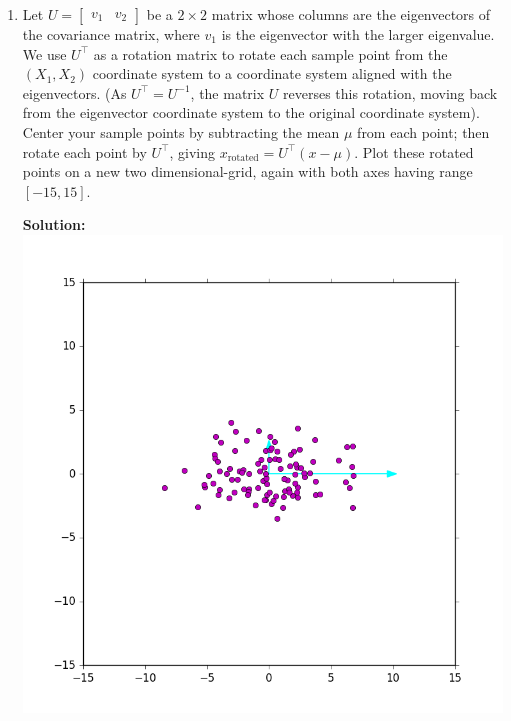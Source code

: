 \documentclass{article}
\newcommand{\solution}{\textbf{Solution: }}
\begin{document}
\begin{enumerate}[label=(\alph*)]
    \item Let $U = \begin{bmatrix} v_1 & v_2 \end{bmatrix}$ be a $2 \times 2$ matrix whose columns are the eigenvectors of the covariance matrix, where $v_1$ is the eigenvector with the larger eigenvalue. We use $U^{\top}$ as a rotation matrix to rotate each sample point from the $(X_1, X_2)$  coordinate system to a coordinate system aligned with the eigenvectors. (As $U^{\top} = U^{-1}$, the matrix $U$ reverses this rotation, moving back from the eigenvector coordinate system to the original coordinate system). Center your sample points by subtracting the mean $\mu$ from each point; then rotate each point by $U^{\top}$, giving $x_{\text{rotated}} = U^{\top}(x - \mu)$.  Plot these rotated points on a new two dimensional-grid, again with both axes having range $[-15, 15]$. 
    \begin{mdframed} \solution
    \includegraphics[scale=.5]{images/eigenvector_e.png}
    \end{mdframed}
    
\end{enumerate}

\newpage
\end{document}
